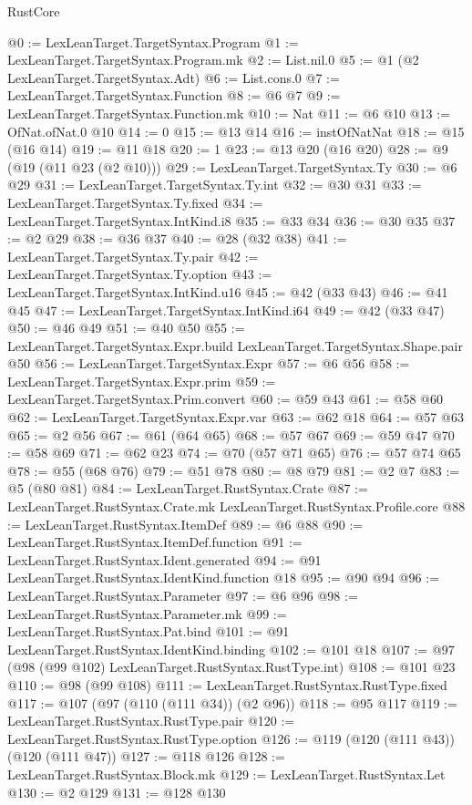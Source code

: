 \begin{lexlean}{RustCore}
\begin{coremodule}
@0 := LexLeanTarget.TargetSyntax.Program
@1 := LexLeanTarget.TargetSyntax.Program.mk
@2 := List.nil.{0}
@5 := @1 (@2 LexLeanTarget.TargetSyntax.Adt)
@6 := List.cons.{0}
@7 := LexLeanTarget.TargetSyntax.Function
@8 := @6 @7
@9 := LexLeanTarget.TargetSyntax.Function.mk
@10 := Nat
@11 := @6 @10
@13 := OfNat.ofNat.{0} @10
@14 := 0
@15 := @13 @14
@16 := instOfNatNat
@18 := @15 (@16 @14)
@19 := @11 @18
@20 := 1
@23 := @13 @20 (@16 @20)
@28 := @9 (@19 (@11 @23 (@2 @10)))
@29 := LexLeanTarget.TargetSyntax.Ty
@30 := @6 @29
@31 := LexLeanTarget.TargetSyntax.Ty.int
@32 := @30 @31
@33 := LexLeanTarget.TargetSyntax.Ty.fixed
@34 := LexLeanTarget.TargetSyntax.IntKind.i8
@35 := @33 @34
@36 := @30 @35
@37 := @2 @29
@38 := @36 @37
@40 := @28 (@32 @38)
@41 := LexLeanTarget.TargetSyntax.Ty.pair
@42 := LexLeanTarget.TargetSyntax.Ty.option
@43 := LexLeanTarget.TargetSyntax.IntKind.u16
@45 := @42 (@33 @43)
@46 := @41 @45
@47 := LexLeanTarget.TargetSyntax.IntKind.i64
@49 := @42 (@33 @47)
@50 := @46 @49
@51 := @40 @50
@55 := LexLeanTarget.TargetSyntax.Expr.build LexLeanTarget.TargetSyntax.Shape.pair @50
@56 := LexLeanTarget.TargetSyntax.Expr
@57 := @6 @56
@58 := LexLeanTarget.TargetSyntax.Expr.prim
@59 := LexLeanTarget.TargetSyntax.Prim.convert
@60 := @59 @43
@61 := @58 @60
@62 := LexLeanTarget.TargetSyntax.Expr.var
@63 := @62 @18
@64 := @57 @63
@65 := @2 @56
@67 := @61 (@64 @65)
@68 := @57 @67
@69 := @59 @47
@70 := @58 @69
@71 := @62 @23
@74 := @70 (@57 @71 @65)
@76 := @57 @74 @65
@78 := @55 (@68 @76)
@79 := @51 @78
@80 := @8 @79
@81 := @2 @7
@83 := @5 (@80 @81)
@84 := LexLeanTarget.RustSyntax.Crate
@87 := LexLeanTarget.RustSyntax.Crate.mk LexLeanTarget.RustSyntax.Profile.core
@88 := LexLeanTarget.RustSyntax.ItemDef
@89 := @6 @88
@90 := LexLeanTarget.RustSyntax.ItemDef.function
@91 := LexLeanTarget.RustSyntax.Ident.generated
@94 := @91 LexLeanTarget.RustSyntax.IdentKind.function @18
@95 := @90 @94
@96 := LexLeanTarget.RustSyntax.Parameter
@97 := @6 @96
@98 := LexLeanTarget.RustSyntax.Parameter.mk
@99 := LexLeanTarget.RustSyntax.Pat.bind
@101 := @91 LexLeanTarget.RustSyntax.IdentKind.binding
@102 := @101 @18
@107 := @97 (@98 (@99 @102) LexLeanTarget.RustSyntax.RustType.int)
@108 := @101 @23
@110 := @98 (@99 @108)
@111 := LexLeanTarget.RustSyntax.RustType.fixed
@117 := @107 (@97 (@110 (@111 @34)) (@2 @96))
@118 := @95 @117
@119 := LexLeanTarget.RustSyntax.RustType.pair
@120 := LexLeanTarget.RustSyntax.RustType.option
@126 := @119 (@120 (@111 @43)) (@120 (@111 @47))
@127 := @118 @126
@128 := LexLeanTarget.RustSyntax.Block.mk
@129 := LexLeanTarget.RustSyntax.Let
@130 := @2 @129
@131 := @128 @130

\end{coremodule}
\end{lexlean}
